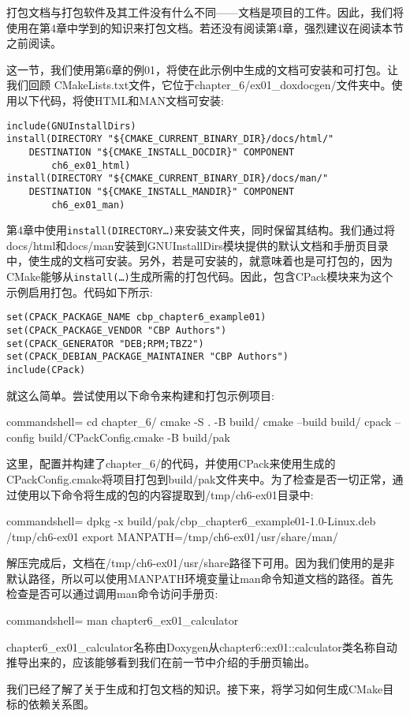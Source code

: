 打包文档与打包软件及其工件没有什么不同——文档是项目的工件。因此，我们将使用在第4章中学到的知识来打包文档。若还没有阅读第4章，强烈建议在阅读本节之前阅读。

这一节，我们使用第6章的例01，将使在此示例中生成的文档可安装和可打包。让我们回顾 CMakeLists.txt文件，它位于chapter\_6/ex01\_doxdocgen/文件夹中。使用以下代码，将使HTML和MAN文档可安装:

\begin{lstlisting}[style=styleCMake]
include(GNUInstallDirs)
install(DIRECTORY "${CMAKE_CURRENT_BINARY_DIR}/docs/html/"
	DESTINATION "${CMAKE_INSTALL_DOCDIR}" COMPONENT
		ch6_ex01_html)
install(DIRECTORY "${CMAKE_CURRENT_BINARY_DIR}/docs/man/"
	DESTINATION "${CMAKE_INSTALL_MANDIR}" COMPONENT
		ch6_ex01_man)
\end{lstlisting}

第4章中使用\texttt{install(DIRECTORY…)}来安装文件夹，同时保留其结构。我们通过将docs/html和docs/man安装到GNUInstallDirs模块提供的默认文档和手册页目录中，使生成的文档可安装。另外，若是可安装的，就意味着也是可打包的，因为CMake能够从\texttt{install(…)}生成所需的打包代码。因此，包含CPack模块来为这个示例启用打包。代码如下所示:

\begin{lstlisting}[style=styleCMake]
set(CPACK_PACKAGE_NAME cbp_chapter6_example01)
set(CPACK_PACKAGE_VENDOR "CBP Authors")
set(CPACK_GENERATOR "DEB;RPM;TBZ2")
set(CPACK_DEBIAN_PACKAGE_MAINTAINER "CBP Authors")
include(CPack)
\end{lstlisting}

就这么简单。尝试使用以下命令来构建和打包示例项目:

\begin{tcblisting}{commandshell={}}
cd chapter_6/
cmake -S . -B build/
cmake --build build/
cpack --config build/CPackConfig.cmake -B build/pak
\end{tcblisting}

这里，配置并构建了chapter\_6/的代码，并使用CPack来使用生成的CPackConfig.cmake将项目打包到build/pak文件夹中。为了检查是否一切正常，通过使用以下命令将生成的包的内容提取到/tmp/ch6-ex01目录中:

\begin{tcblisting}{commandshell={}}
dpkg -x build/pak/cbp_chapter6_example01-1.0-Linux.deb
  /tmp/ch6-ex01
export MANPATH=/tmp/ch6-ex01/usr/share/man/
\end{tcblisting}

解压完成后，文档在/tmp/ch6-ex01/usr/share路径下可用。因为我们使用的是非默认路径，所以可以使用MANPATH环境变量让man命令知道文档的路径。首先检查是否可以通过调用man命令访问手册页:

\begin{tcblisting}{commandshell={}}
man chapter6_ex01_calculator
\end{tcblisting}

chapter6\_ex01\_calculator名称由Doxygen从chapter6::ex01::calculator类名称自动推导出来的，应该能够看到我们在前一节中介绍的手册页输出。

我们已经了解了关于生成和打包文档的知识。接下来，将学习如何生成CMake目标的依赖关系图。




